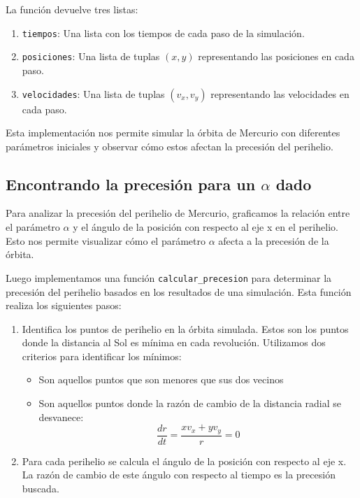 \documentclass[twocolumn]{article}
\begin{document}
La función devuelve tres listas:
\begin{enumerate}
    \item \texttt{tiempos}: Una lista con los tiempos de cada paso de la simulación.
    \item \texttt{posiciones}: Una lista de tuplas $(x, y)$ representando las posiciones en cada paso.
    \item \texttt{velocidades}: Una lista de tuplas $(v_x, v_y)$ representando las velocidades en cada paso.
\end{enumerate}

Esta implementación nos permite simular la órbita de Mercurio con diferentes parámetros iniciales y observar cómo estos afectan la precesión del perihelio.

\subsection{Encontrando la precesión para un $\alpha$ dado}

Para analizar la precesión del perihelio de Mercurio, graficamos la relación entre el parámetro $\alpha$ y el ángulo de la posición con respecto al eje x en el perihelio. Esto nos permite visualizar cómo el parámetro $\alpha$ afecta a la precesión de la órbita.

Luego implementamos una función \texttt{calcular\_precesion} para determinar la precesión del perihelio basados en los resultados de una simulación. Esta función realiza los siguientes pasos:

\begin{enumerate}
    \item Identifica los puntos de perihelio en la órbita simulada. Estos son los puntos donde la distancia al Sol es mínima en cada revolución. Utilizamos dos criterios para identificar los mínimos:
    \begin{itemize}
        \item Son aquellos puntos que son menores que sus dos vecinos
        \item Son aquellos puntos donde la razón de cambio de la distancia radial se desvanece:
        \begin{equation}
        \frac{dr}{dt} = \frac{xv_x + yv_y}{r} = 0
        \end{equation}
\end{itemize}
     \item Para cada perihelio se calcula el ángulo de la posición con respecto al eje x. La razón de cambio de este ángulo con respecto al tiempo es la precesión buscada.
\end{enumerate}
\end{document}
